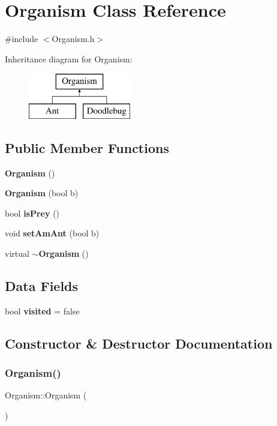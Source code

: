 \section{Organism Class Reference}
\label{classOrganism}


{\ttfamily \#include $<$Organism.\+h$>$}

Inheritance diagram for Organism\+:\begin{figure}[H]
\begin{center}
\leavevmode
\includegraphics[height=2.000000cm]{classOrganism}
\end{center}
\end{figure}
\subsection*{Public Member Functions}
\begin{DoxyCompactItemize}
\item 
\textbf{ Organism} ()
\item 
\textbf{ Organism} (bool b)
\item 
bool \textbf{ is\+Prey} ()
\item 
void \textbf{ set\+Am\+Ant} (bool b)
\item 
virtual \textbf{ $\sim$\+Organism} ()
\end{DoxyCompactItemize}
\subsection*{Data Fields}
\begin{DoxyCompactItemize}
\item 
bool \textbf{ visited} = false
\end{DoxyCompactItemize}


\subsection{Constructor \& Destructor Documentation}
\mbox{\label{classOrganism_aeb16ee24b64839584b4862384d0b53fe}} 
\subsubsection{Organism()\hspace{0.1cm}{\footnotesize\ttfamily [1/2]}}
{\footnotesize\ttfamily Organism\+::\+Organism (\begin{DoxyParamCaption}{ }\end{DoxyParamCaption})}

